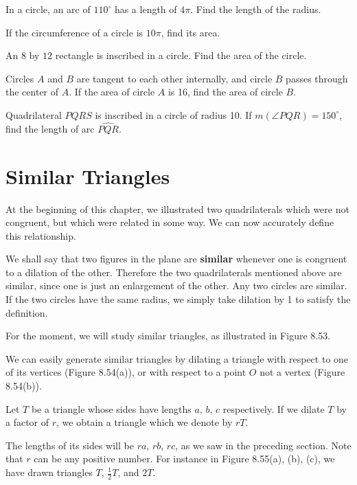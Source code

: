\documentclass[12pt]{book} %
\begin{document}
\begin{ExerciseList}
\Exercise In a circle, an arc of $110^\circ$ has a length of $4\pi$. Find the length of the radius.

\Exercise If the circumference of a circle is $10\pi$, find its area.

\Exercise An $8$ by $12$ rectangle is inscribed in a circle. Find the area of the circle.

\Exercise Circles $A$ and $B$ are tangent to each other internally, and circle $B$ passes through the center of $A$. If the area of circle $A$ is 16, find the area of circle $B$.


\Exercise Quadrilateral $PQRS$ is inscribed in a circle of radius 10. If $m(\angle PQR)=150^\circ$, find the length of arc $\widehat{PQR}$.
\end{ExerciseList}

\section{Similar Triangles}

At the beginning of this chapter, we illustrated two quadrilaterals which were not congruent, but which were related in some way. We can now accurately define this relationship.

We shall say that two figures in the plane are \textbf{similar} whenever one is congruent to a dilation of the other. Therefore the two quadrilaterals mentioned above are similar, since one is just an enlargement of the other. Any two circles are similar. If the two circles have the same radius, we simply take dilation by 1 to satisfy the definition.

For the moment, we will study similar triangles, as illustrated in Figure 8.53.


We can easily generate similar triangles by dilating a triangle with respect to one of its vertices (Figure 8.54(a)), or with respect to a point $O$ not a vertex (Figure 8.54(b)).


Let $T$ be a triangle whose sides have lengths $a$, $b$, $c$ respectively. If we dilate $T$ by a factor of $r$, we obtain a triangle which we denote by $rT$.

The lengths of its sides will be $ra$, $rb$, $rc$, as we saw in the preceding section. Note that $r$ can be any positive number. For instance in Figure 8.55(a), (b), (c), we have drawn triangles $T$, $\frac12 T$, and $2T$.
\end{document}
